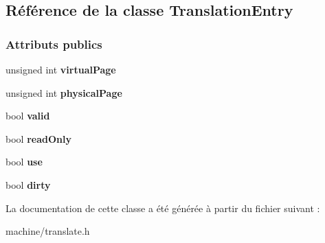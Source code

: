 \hypertarget{class_translation_entry}{}\subsection{Référence de la classe Translation\+Entry}
\label{class_translation_entry}
\subsubsection*{Attributs publics}
\begin{DoxyCompactItemize}
\item 
\hypertarget{class_translation_entry_af7d48c86a1188e1e78f00d3eaa1b21ad}{}\label{class_translation_entry_af7d48c86a1188e1e78f00d3eaa1b21ad} 
unsigned int {\bfseries virtual\+Page}
\item 
\hypertarget{class_translation_entry_ada1901a6079061755592c3b5d6a4098c}{}\label{class_translation_entry_ada1901a6079061755592c3b5d6a4098c} 
unsigned int {\bfseries physical\+Page}
\item 
\hypertarget{class_translation_entry_a655ccdb71f2e1c8bc43d751b5c375cd2}{}\label{class_translation_entry_a655ccdb71f2e1c8bc43d751b5c375cd2} 
bool {\bfseries valid}
\item 
\hypertarget{class_translation_entry_a99d5c440c0d011213a39edf4d0844a7d}{}\label{class_translation_entry_a99d5c440c0d011213a39edf4d0844a7d} 
bool {\bfseries read\+Only}
\item 
\hypertarget{class_translation_entry_acd4ec2f9980de42c849562c211a3813a}{}\label{class_translation_entry_acd4ec2f9980de42c849562c211a3813a} 
bool {\bfseries use}
\item 
\hypertarget{class_translation_entry_a4a198eb7773a247967dcf4e377d3717f}{}\label{class_translation_entry_a4a198eb7773a247967dcf4e377d3717f} 
bool {\bfseries dirty}
\end{DoxyCompactItemize}


La documentation de cette classe a été générée à partir du fichier suivant \+:\begin{DoxyCompactItemize}
\item 
machine/translate.\+h\end{DoxyCompactItemize}
